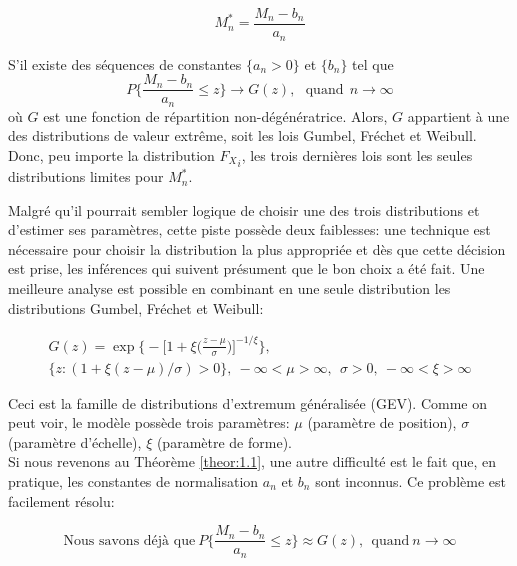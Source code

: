 \begin{equation}\label{eq:1.1.2}
M^*_n = \frac{M_n - b_n}{a_n}
\end{equation}

\begin{theorem}\label{theor:1.1}
S'il existe des séquences de constantes $\{a_n > 0\}$ et $\{b_n\}$ tel que $$P\Bigg\{\frac{M_n - b_n}{a_n} \le z \Bigg\}\to G(z), \ \ \  \text{quand} \ \ {n \to \infty}$$ où $G$ est une fonction de répartition non-dégénératrice. Alors, $G$ appartient à une des distributions de valeur extrême, soit les lois Gumbel, Fréchet et Weibull. Donc, peu importe la distribution ${F_X}_i$, les trois dernières lois sont les seules distributions limites pour $M^*_n$.
\end{theorem}

Malgré qu'il pourrait sembler logique de choisir une des trois distributions et d'estimer ses paramètres, cette piste possède deux faiblesses: une technique est nécessaire pour choisir la distribution la plus appropriée et dès que cette décision est prise, les inférences qui suivent présument que le bon choix a été fait. Une meilleure analyse est possible en combinant en une seule distribution les distributions Gumbel, Fréchet et Weibull:

\begin{equation}\label{eq:1.1.3}
\begin{gathered}
G(z) = \exp \Bigg\{ - \Big[ 1 +\xi\Big(\frac{z-\mu}{\sigma}\Big) \Big]^{-1/\xi}  \Bigg\}, \\
\{z: (1 + \xi(z- \mu)/\sigma) >0\},\ -\infty<\mu>\infty,\ \  \sigma>0,\ -\infty<\xi>\infty
\end{gathered}
\end{equation}

Ceci est la famille de distributions d'extremum généralisée (GEV). Comme on peut voir, le modèle possède trois paramètres: $\mu$ (paramètre de position), $\sigma$ (paramètre d'échelle), $\xi$ (paramètre de forme).\\

Si nous revenons au Théorème \ref{theor:1.1}, une autre difficulté est le fait que, en pratique, les constantes de normalisation $a_n$ et $b_n$ sont inconnus. Ce problème est facilement résolu: 

\begin{equation*}
\text{Nous savons déjà que} \ P\Bigg\{\frac{M_n - b_n}{a_n} \le z \Bigg\} \approx G(z), \ \ \text{quand} \ n\to\infty 
\end{equation*}

